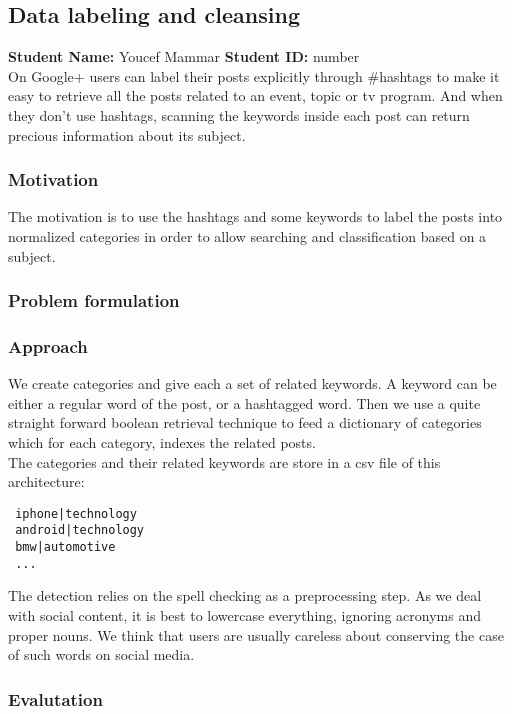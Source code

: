 \subsection{Data labeling and cleansing}
\textbf{Student Name: }Youcef Mammar \textbf{Student ID:} number\\

On Google+ users can label their posts explicitly through \#hashtags to make it easy to retrieve 
all the posts related to an event, topic or tv program. And when they don’t use hashtags, 
scanning the keywords inside each post can return precious information about its subject.

\subsubsection*{Motivation}
The motivation is to use the hashtags and some keywords to label the posts into normalized categories 
in order to allow searching and classification based on a subject.

\subsubsection*{Problem formulation}

\subsubsection*{Approach}
We create categories and give each a set of related keywords. A keyword can be either a regular word of 
the post, or a hashtagged word. Then we use a quite straight forward boolean retrieval technique to 
feed a dictionary of categories which for each category, indexes the related posts. \\
The categories and their related keywords are store in a csv file of this architecture:

\begin{verbatim}
 iphone|technology
 android|technology
 bmw|automotive
 ...
\end{verbatim}

The detection relies on the spell checking as a preprocessing step. As we deal with social content, it is 
best to lowercase everything, ignoring acronyms and proper nouns. We think that users are usually careless 
about conserving the case of such words on social media.

\subsubsection{Evalutation}


